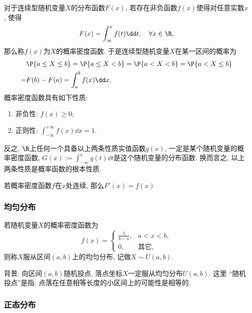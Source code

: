 \documentclass[11pt]{ctexart}
\begin{document}
对于连续型随机变量$X$的分布函数$F(x)$, 若存在非负函数$f(x)$使得对任意实数$x$, 使得
\begin{equation*}
	F(x) = \int_{\infty}^x f(t) \dd t, \quad \forall x \in \R, 
\end{equation*}
那么称$f(x)$为$X$的{\keben 概率密度函数}. 
于是连续型随机变量$X$在某一区间的概率为
\begin{align*}
	&\P\{a \leq X \leq b\}
	= \P\{a \leq X < b\}
	= \P\{a < X < b\}
	=\P\{a < X \leq b\} \\
	=& F(b) - F(a)
	= \int_a^b f(x) \dd x. 
\end{align*}
概率密度函数具有如下性质: 
\begin{enumerate}[label=(\arabic*)]
	\item {\keben 非负性:} $f(x) \geq 0$; 
	\item {\keben 正则性:} $\int_{-\infty}^{+\infty} f(x) \dd x = 1$. 
\end{enumerate}
反之, $\R$上任何一个具备以上两条性质实值函数$g(x)$, 一定是某个随机变量的概率密度函数, $G(x):= \int_{-\infty}^x g(t) \dd t$是这个随机变量的分布函数. 
换而言之, 以上两条性质是概率函数的根本性质. 

\begin{theorem}
	若概率密度函数$f$在$x$处连续, 那么$F'(x) = f(x)$	
\end{theorem}


\subsubsection{均匀分布}
若随机变量$X$的概率密度函数为
\begin{equation*}
	f(x) = 
	\begin{cases}
		\frac{1}{b-a}, & a < x < b, \\
		0, &\text{其它},
	\end{cases}
\end{equation*}
则称$X$服从区间$(a, b)$上的均匀分布, 记做$X \sim U(a, b)$. 

背景: 向区间$(a, b)$随机投点, 落点坐标$X$一定服从均匀分布$U(a, b)$. 
这里 “随机投点”是指: 点落在任意相等长度的小区间上的可能性是相等的. 

\subsubsection{正态分布}
\end{document}
